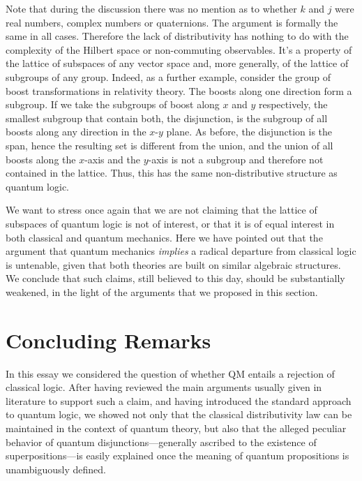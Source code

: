 \documentclass[11pt, executivepaper]{article}
\begin{document}
Note that during the discussion there was no mention as to whether $k$ and $j$ were real numbers, complex numbers or quaternions. The argument is formally the same in all cases. Therefore the lack of distributivity has nothing to do with the complexity of the Hilbert space or non-commuting observables. It's a property of the lattice of subspaces of any vector space and, more generally, of the lattice of subgroups of any group. Indeed, as a further example, consider the group of boost transformations in relativity theory. The boosts along one direction form a subgroup. If we take the subgroups of boost along $x$ and $y$ respectively, the smallest subgroup that contain both, the disjunction, is the subgroup of all boosts along any direction in the $x$-$y$ plane. As before, the disjunction is the span, hence the resulting set is different from the union, and the union of all boosts along the $x$-axis and the $y$-axis is not a subgroup and therefore not contained in the lattice. Thus, this has the same non-distributive structure as quantum logic.

We want to stress once again that we are not claiming that the lattice of subspaces of quantum logic is not of interest, or that it is of equal interest in both classical and quantum mechanics. Here we have pointed out that the argument that quantum mechanics \emph{implies} a radical departure from classical logic is untenable, given that both theories are built on similar algebraic structures. We conclude that such claims, still believed to this day, should be substantially weakened, in the light of the arguments that we proposed in this section. 

\section{Concluding Remarks}
\label{conc}

In this essay we considered the question of whether QM entails a rejection of classical logic. After having reviewed the main arguments usually given in literature to support such a claim, and having introduced the standard approach to quantum logic, we showed not only that the classical distributivity law can be maintained in the context of quantum theory, but also that the alleged peculiar behavior of quantum disjunctions---generally ascribed to the existence of superpositions---is easily explained once the meaning of quantum propositions is unambiguously defined. 
\end{document}
